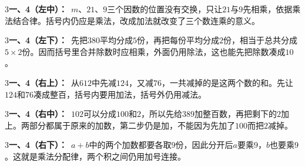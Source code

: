 \documentclass[multi=snippet,border={5bp 20bp 5bp 5bp}]{standalone}
\newenvironment{snippet}[3]{\begin{minipage}{#1bp}\color{answerred}\fontsize{#2}{#3}\selectfont\raggedright}{\end{minipage}}
\begin{document}
\begin{snippet}{505}{11.5}{14}\begin{multicols}{3}\raggedcolumns \textbf{一、4（左中）：}\ \(m\)\allowbreak 、\(21\)\allowbreak 、\(9\)\allowbreak 三个因数的位置没有交换，只让\(21\)\allowbreak 与\(9\)\allowbreak 先相乘，依据乘法结合律。括号内仍应是乘法，改成加法就改变了三个数连乘的意义。\end{multicols}\end{snippet}
\begin{snippet}{505}{11.5}{14}\begin{multicols}{3}\raggedcolumns \textbf{一、4（左下）：}\ 先把\(380\)\allowbreak 平均分成\(5\)\allowbreak 份，再把每份平均分成\(2\)\allowbreak 份，相当于总共分成\(5\times2\)\allowbreak 份。因而括号里合并除数时应相乘，外面仍用除法，这也能先把除数凑成\(10\)\allowbreak 。\end{multicols}\end{snippet}
\begin{snippet}{505}{11.5}{14}\begin{multicols}{3}\raggedcolumns \textbf{一、4（右上）：}\ 从\(612\)\allowbreak 中先减\(124\)\allowbreak ，又减\(76\)\allowbreak ，一共减掉的是这两个数的和。先让\(124\)\allowbreak 和\(76\)\allowbreak 凑成整百，括号内要用加法，括号外仍用减法。\end{multicols}\end{snippet}
\begin{snippet}{505}{11.5}{14}\begin{multicols}{3}\raggedcolumns \textbf{一、4（右中）：}\ \(102\)\allowbreak 可以分成\(100\)\allowbreak 和\(2\)\allowbreak ，所以先给\(389\)\allowbreak 加整百数，再把剩下的\(2\)\allowbreak 加上。两部分都属于原来的加数，第二步仍是加，不能因为先加了\(100\)\allowbreak 而把\(2\)\allowbreak 减掉。\end{multicols}\end{snippet}
\begin{snippet}{505}{11.5}{14}\begin{multicols}{3}\raggedcolumns \textbf{一、4（右下）：}\ \(a+b\)\allowbreak 中的两个加数都要各取\(9\)\allowbreak 份，因此分开后\(a\)\allowbreak 要乘\(9\)\allowbreak ，\(b\)\allowbreak 也要乘\(9\)\allowbreak 。这就是乘法分配律，两个积之间仍用加号连接。\end{multicols}\end{snippet}
\end{document}

